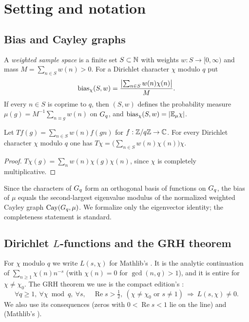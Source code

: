 \section{Setting and notation}\label{sec:background}

\subsection{Bias and Cayley graphs}
A \emph{weighted sample space} is a finite set $S\subset\mathbb{N}$ with weights $w:S\to[0,\infty)$ and mass
$M=\sum_{n\in S}w(n)>0$. For a Dirichlet character $\chi$ modulo $q$ put
\[
  \operatorname{bias}_\chi(S,w)=\frac{\bigl\lvert\sum_{n\in S}w(n)\chi(n)\bigr\rvert}{M}.
\]
If every $n\in S$ is coprime to $q$, then $(S,w)$ defines the probability measure $\mu(g)=M^{-1}\sum_{n\equiv
g}w(n)$ on $G_q$, and $\operatorname{bias}_\chi(S,w)=\left\lvert \mathbb E_\mu\chi \right\rvert$.

\begin{lemma}\label{lem:eigen}
Let $T f(g)=\sum_{n\in S}w(n)f(gn)$ for $f:\mathbb{Z}/q\mathbb{Z}\to\mathbb{C}$. For every Dirichlet character $\chi$ modulo
$q$ one has $T\chi=\bigl(\sum_{n\in S}w(n)\chi(n)\bigr)\chi$.
\end{lemma}
\begin{proof}
$T\chi(g)=\sum_n w(n)\chi(g)\chi(n)$, since $\chi$ is completely multiplicative.
\end{proof}

Since the characters of $G_q$ form an orthogonal basis of functions on $G_q$, the bias of $\mu$ equals the
second-largest eigenvalue modulus of the normalized weighted Cayley graph $\mathrm{Cay}(G_q,\mu)$. We
formalize only the eigenvector identity; the completeness statement is standard.

\subsection{Dirichlet $L$-functions and the GRH theorem}
For $\chi$ modulo $q$ we write $L(s,\chi)$ for Mathlib's . It is the
analytic continuation of $\sum_{n\ge1}\chi(n)n^{-s}$ (with $\chi(n)=0$ for $\gcd(n,q)>1$), and it is entire
for $\chi\ne\chi_0$. The GRH theorem we use is the compact edition's 
\cite{grhlean}:
\begin{equation}\label{eq:grh}
  \forall q\ge1,\ \forall\chi \bmod q,\ \forall s,\quad \operatorname{Re}s>\tfrac12,\ (\chi\ne\chi_0\text{ or } s\ne1)
  \ \Longrightarrow\ L(s,\chi)\ne0 .
\end{equation}
We also use its consequences  (zeros with $0<\operatorname{Re}s<1$ lie on the line)
and  (Mathlib's ).

